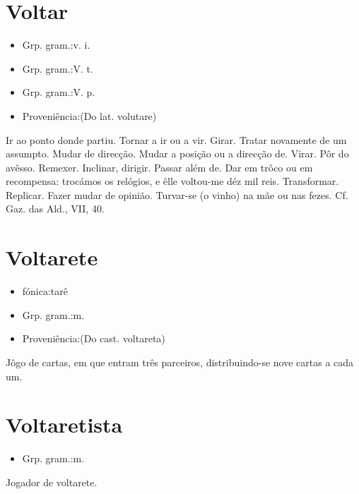 \documentclass{article}
\begin{document}
\section{Voltar}
\begin{itemize}
\item {Grp. gram.:v. i.}
\end{itemize}
\begin{itemize}
\item {Grp. gram.:V. t.}
\end{itemize}
\begin{itemize}
\item {Grp. gram.:V. p.}
\end{itemize}
\begin{itemize}
\item {Proveniência:(Do lat. \textunderscore volutare\textunderscore )}
\end{itemize}
Ir ao ponto donde partiu.
Tornar a ir ou a vir.
Girar.
Tratar novamente de um assumpto.
Mudar de direcção.
Mudar a posição ou a direcção de.
Virar.
Pôr do avêsso.
Remexer.
Inclinar, dirigir.
Passar além de.
Dar em trôco ou em recompensa: \textunderscore trocámos os relógios, e êlle voltou-me déz mil reis\textunderscore .
Transformar.
Replicar.
Fazer mudar de opinião.
Turvar-se (o vinho) na mãe ou nas fezes. Cf. \textunderscore Gaz. das Ald.\textunderscore , VII, 40.
\section{Voltarete}
\begin{itemize}
\item {fónica:tarê}
\end{itemize}
\begin{itemize}
\item {Grp. gram.:m.}
\end{itemize}
\begin{itemize}
\item {Proveniência:(Do cast. \textunderscore voltareta\textunderscore )}
\end{itemize}
Jôgo de cartas, em que entram três parceiros, distribuindo-se nove cartas a cada um.
\section{Voltaretista}
\begin{itemize}
\item {Grp. gram.:m.}
\end{itemize}
Jogador de voltarete.
\end{document}
